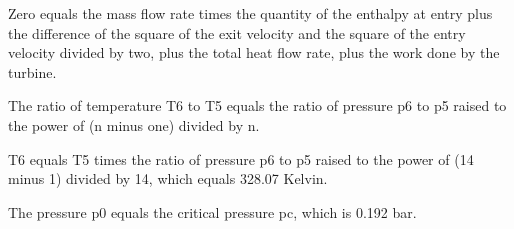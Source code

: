 Zero equals the mass flow rate times the quantity of the enthalpy at entry plus the difference of the square of the exit velocity and the square of the entry velocity divided by two, plus the total heat flow rate, plus the work done by the turbine.

The ratio of temperature T6 to T5 equals the ratio of pressure p6 to p5 raised to the power of (n minus one) divided by n.

T6 equals T5 times the ratio of pressure p6 to p5 raised to the power of (14 minus 1) divided by 14, which equals 328.07 Kelvin.

The pressure p0 equals the critical pressure pc, which is 0.192 bar.